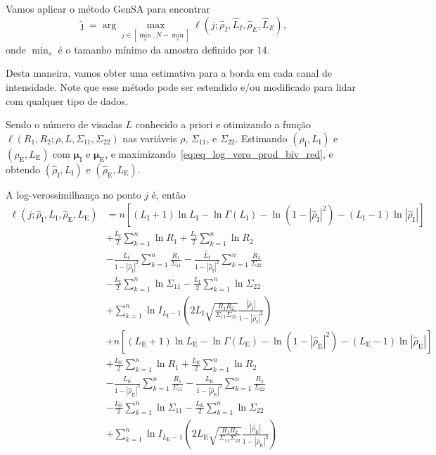 Vamos aplicar o método GenSA para encontrar
$$
\widehat{\jmath}= \arg\max\limits_{j\in [\min_s,N-\min_s]}\ell(j;\widehat{\rho}_I, \widehat{L}_I,\widehat{\rho}_E, \widehat{L}_E),
$$ 
onde $\min_s$ é o tamanho mínimo da amostra definido por $14$.

Desta maneira, vamos obter uma estimativa para a borda em cada canal de intensidade.
Note que esse método pode ser estendido e/ou modificado para lidar com qualquer tipo de dados.

Sendo o número de visadas $L$ conhecido a priori e otimizando a função $\ell(R_1, R_2;\rho, L, \Sigma_{11}, \Sigma_{22})$ nas variáveis $\rho$, $\Sigma_{11}$, e $\Sigma_{22}$. Estimando $(\rho_\text{I},L_\text{I})$ e $(\rho_\text{E},L_\text{E})$ com $\bm \mu_\text{I}$ e $\bm \mu_\text{E}$, e maximizando~\eqref{eq:eq_log_vero_prod_biv_red}, e obtendo $(\widehat{\rho}_\text{I}, L_\text{I})$ e $(\widehat{\rho}_\text{E}, L_\text{E})$.

A log-verossimilhança no ponto $j$ é, então
\begin{equation}\label{eq:TotalLogLikelihood}
\begin{split}
\ell(j;\widehat{\rho}_\text{I}, L_\text{I}, \widehat{\rho}_\text{E}, L_\text{E})&=n\left[(L_\text{I}+1)\ln L_\text{I} - \ln\Gamma(L_\text{I})- \ln(1-|\widehat{\rho}_\text{I}|^2)-(L_\text{I}-1)\ln|\widehat{\rho}_\text{I}|\right] \\
                        &+\frac{L_\text{I}}{2}\sum_{k=1}^{n} \ln R_1 +\frac{L_\text{I}}{2} \sum_{k=1}^{n}\ln R_2\\
                        &-\frac{L_\text{I}}{1-|\widehat{\rho}_\text{I}|^2}\sum_{k=1}^{n}\frac{R_1}{\Sigma_{11}}-\frac{\widehat{L}_\text{I}}{1-|\widehat{\rho}_\text{I}|^2}\sum_{k=1}^{n}\frac{R_2}{\Sigma_{22}}\\
	&-\frac{L_\text{I}}{2}\sum_{k=1}^{n}\ln\Sigma_{11}-\frac{L_\text{I}}{2}\sum_{k=1}^{n}\ln\Sigma_{22} \\
	&+\sum_{k=1}^{n}\ln I_{L_\text{I}-1}\left(2L_\text{I}\sqrt{\frac{R_1R_2}{\Sigma_{11}\Sigma_{22}}}\frac{|\widehat{\rho}_\text{I}|}{1-|\widehat{\rho}_\text{I}|^2}\right)\\
	&+n\left[(L_\text{E}+1)\ln L_\text{E} - \ln\Gamma(L_\text{E})- \ln(1-|\widehat{\rho}_\text{E}|^2)-(L_\text{E}-1)\ln|\widehat{\rho}_\text{E}|\right] \\
                        &+\frac{L_\text{E}}{2}\sum_{k=1}^{n} \ln R_1 +\frac{L_\text{E}}{2} \sum_{k=1}^{n}\ln R_2\\
                        &-\frac{L_\text{E}}{1-|\widehat{\rho}_\text{E}|^2}\sum_{k=1}^{n}\frac{R_1}{\Sigma_{11}}-\frac{L_\text{E}}{1-|\widehat{\rho}_\text{E}|^2}\sum_{k=1}^{n}\frac{R_2}{\Sigma_{22}}\\
	&-\frac{L_\text{E}}{2}\sum_{k=1}^{n}\ln\Sigma_{11}-\frac{L_\text{E}}{2}\sum_{k=1}^{n}\ln\Sigma_{22} \\
	&+\sum_{k=1}^{n}\ln I_{L_\text{E}-1}\left(2L_\text{E}\sqrt{\frac{R_1R_2}{\Sigma_{11}\Sigma_{22}}}\frac{|\widehat{\rho}_\text{E}|}{1-|\widehat{\rho}_\text{E}|^2}\right)
\end{split}
\end{equation}


